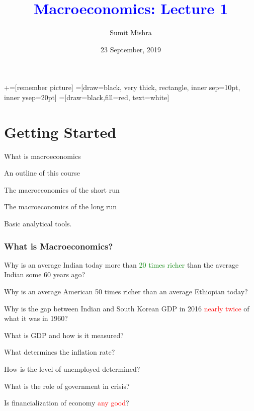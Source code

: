\documentclass[shownotes,11pt, aspectratio=169]{beamer}
\title[]{\textcolor{blue}{Macroeconomics: Lecture 1}}
\author[SM]{Sumit Mishra}
\institute[IFMR]{\small{\begin{tabular}{c}
IFMR, Sri City \\
\end{tabular}}}
\date{23 September, 2019}
\newenvironment{wideitemize}{\itemize\addtolength{\itemsep}{10pt}}{\enditemize}
\begin{document}
\newcommand\marktopleft[1]{%
    \tikz[overlay,remember picture] 
        \node (marker-#1-a) at (-.3em,.3em) {};%
}
\newcommand\markbottomright[2]{%
    \tikz[overlay,remember picture] 
        \node (marker-#1-b) at (0em,0em) {};%
}
+=[remember picture] 
 =[draw=black, very thick, rectangle, inner sep=10pt, inner ysep=20pt]
 =[draw=black,fill=red, text=white]

\begin{frame}
\maketitle
\end{frame}

\section{Getting Started}
\begin{frame}
\begin{wideitemize}
\item What is macroeconomics
\item An outline of this course
\item The macroeconomics of the short run
\item The macroeconomics of the long run
\item Basic analytical tools. 
\end{wideitemize}
\end{frame}

\begin{frame}
\frametitle{What is Macroeconomics?}
\begin{wideitemize}
\item Why is an average Indian today more than \textcolor{green}{20 times richer} than the average Indian some 60 years ago?
\item Why is an average American 50 times richer than an average Ethiopian today?
\item Why is the gap between Indian and South Korean GDP in 2016 \textcolor{red}{nearly twice} of what it was in 1960?
\item What is GDP and how is it measured?
\item What determines the inflation rate?
\item How is the level of unemployed determined?
\item What is the role of government in crisis?
\item Is financialization of economy \textcolor{red}{any good}?
\end{wideitemize}
\end{frame}
\end{document}
